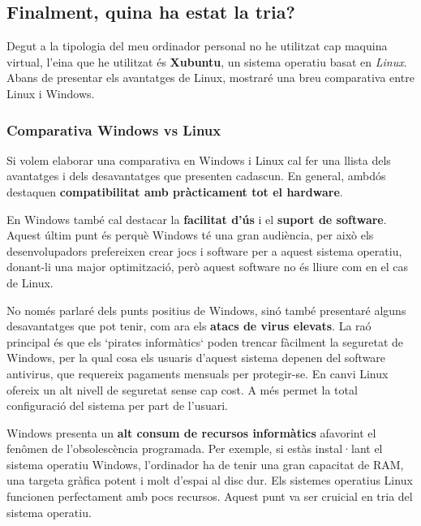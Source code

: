 \subsection*{Finalment, quina ha estat la tria?}
Degut a la tipologia del meu ordinador personal no he utilitzat cap maquina virtual, l'eina que he utilitzat és \textbf{Xubuntu}, un sistema operatiu basat en \textit{Linux}. Abans de presentar els avantatges de Linux, mostraré una breu comparativa entre Linux i Windows.

\subsubsection{Comparativa Windows vs Linux}
Si volem elaborar una comparativa en Windows i Linux cal fer una llista dels avantatges i dels desavantatges que presenten cadascun. En general, ambdós destaquen \textbf{compatibilitat amb pràcticament tot el hardware}.

En Windows també cal destacar la \textbf{facilitat d’ús} i el \textbf{suport de software}. Aquest últim punt és perquè Windows té una gran audiència, per això els desenvolupadors prefereixen crear jocs i software per a aquest sistema operatiu, donant-li una major optimització, però aquest software no és lliure com en el cas de Linux.

No només parlaré dels punts positius de Windows, sinó també presentaré alguns desavantatges que pot tenir, com ara els \textbf{atacs de virus elevats}. La raó principal és que els `pirates informàtics` poden trencar fàcilment la seguretat de Windows, per la qual cosa els usuaris d’aquest sistema depenen del software antivirus, que requereix pagaments mensuals per protegir-se. En canvi Linux ofereix un alt nivell de seguretat sense cap cost. A més permet la total configuració del sistema per part de l'usuari.

Windows presenta un \textbf{alt consum de recursos informàtics} afavorint el fenômen de l'obsolescència programada. Per exemple, si estàs instal·lant el sistema operatiu Windows, l’ordinador ha de tenir una gran capacitat de RAM, una targeta gràfica potent i molt d’espai al disc dur. Els sistemes operatius Linux funcionen perfectament amb pocs recursos. Aquest punt va ser cruicial en tria del sistema operatiu.

